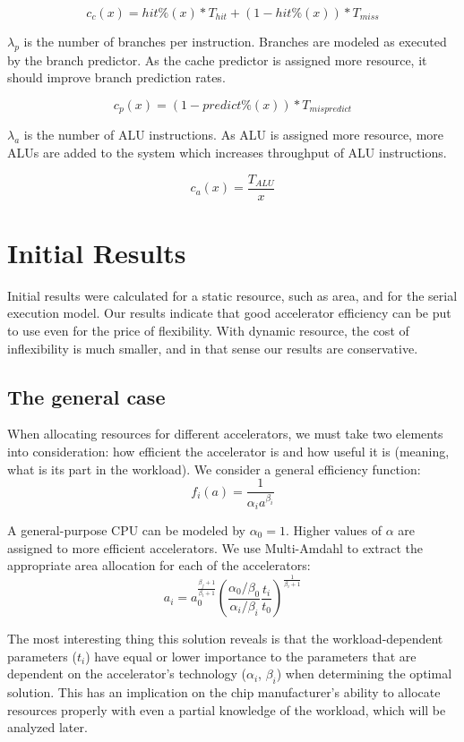 \documentclass[twocolumn,english]{IEEEtran}
\begin{document}
\[
c_{c}(x)=hit\%(x)*T_{hit}+(1-hit\%(x))*T_{miss}\]


$\lambda_{p}$ is the number of branches per instruction. Branches
are modeled as executed by the branch predictor. As the cache predictor
is assigned more resource, it should improve branch prediction rates.

\[
c_{p}(x)=(1-predict\%(x))*T_{mispredict}\]


$\lambda_{a}$ is the number of ALU instructions. As ALU is assigned
more resource, more ALUs are added to the system which increases throughput
of ALU instructions. 

\[
c_{a}(x)=\frac{T_{ALU}}{x}\]



\section{Initial Results}

Initial results were calculated for a static resource, such as area,
and for the serial execution model. Our results indicate that good
accelerator efficiency can be put to use even for the price of flexibility.
With dynamic resource, the cost of inflexibility is much smaller,
and in that sense our results are conservative.


\subsection{The general case}

When allocating resources for different accelerators, we must take
two elements into consideration: how efficient the accelerator is
and how useful it is (meaning, what is its part in the workload).
We consider a general efficiency function:\[
f_{i}(a)=\frac{1}{\alpha_{i}a^{\beta_{i}}}\]


A general-purpose CPU can be modeled by $\alpha_{0}=1$. Higher values
of $\alpha$ are assigned to more efficient accelerators. We use Multi-Amdahl
to extract the appropriate area allocation for each of the accelerators:\begin{equation}
a_{i}=a_{0}^{\frac{\beta_{j}+1}{\beta_{i}+1}}\left(\frac{\alpha_{0}/\beta_{0}}{\alpha_{i}/\beta_{i}}\frac{t_{i}}{t_{0}}\right)^{\frac{1}{\beta_{i}+1}}\label{eq:area_general_result}\end{equation}


The most interesting thing this solution reveals is that the workload-dependent
parameters ($t_{i}$) have equal or lower importance to the parameters
that are dependent on the accelerator's technology ($\alpha_{i}$,
$\beta_{i}$) when determining the optimal solution. This has an implication
on the chip manufacturer's ability to allocate resources properly
with even a partial knowledge of the workload, which will be analyzed
later.
\end{document}
